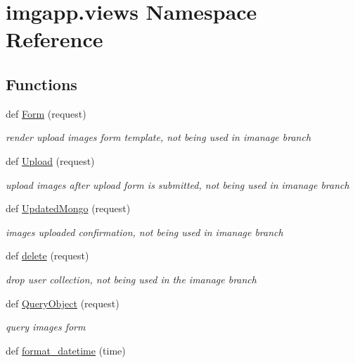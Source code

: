 \hypertarget{namespaceimgapp_1_1views}{}\section{imgapp.\+views Namespace Reference}
\label{namespaceimgapp_1_1views}
\subsection*{Functions}
\begin{DoxyCompactItemize}
\item 
def \hyperlink{namespaceimgapp_1_1views_adcf4ad535b76cf41f5894ad57bcdbc43}{Form} (request)
\begin{DoxyCompactList}\small\item\em render upload images form template, not being used in imanage branch \end{DoxyCompactList}\item 
def \hyperlink{namespaceimgapp_1_1views_a30bd5c7a24785551afd3da58fa259a6b}{Upload} (request)
\begin{DoxyCompactList}\small\item\em upload images after upload form is submitted, not being used in imanage branch \end{DoxyCompactList}\item 
def \hyperlink{namespaceimgapp_1_1views_a3e7e98b43ec1f6f0205f62d1ddcc505b}{Updated\+Mongo} (request)
\begin{DoxyCompactList}\small\item\em images uploaded confirmation, not being used in imanage branch \end{DoxyCompactList}\item 
def \hyperlink{namespaceimgapp_1_1views_ad231247785394cfcbefcf27970310f64}{delete} (request)
\begin{DoxyCompactList}\small\item\em drop user collection, not being used in the imanage branch \end{DoxyCompactList}\item 
def \hyperlink{namespaceimgapp_1_1views_a42d42280064441dcaa48088fe3e43222}{Query\+Object} (request)
\begin{DoxyCompactList}\small\item\em query images form \end{DoxyCompactList}\item 
def \hyperlink{namespaceimgapp_1_1views_a0bad743f7a5c8bce58dbe6250dbc105f}{format\+\_\+datetime} (time)

\end{DoxyCompactItemize}
